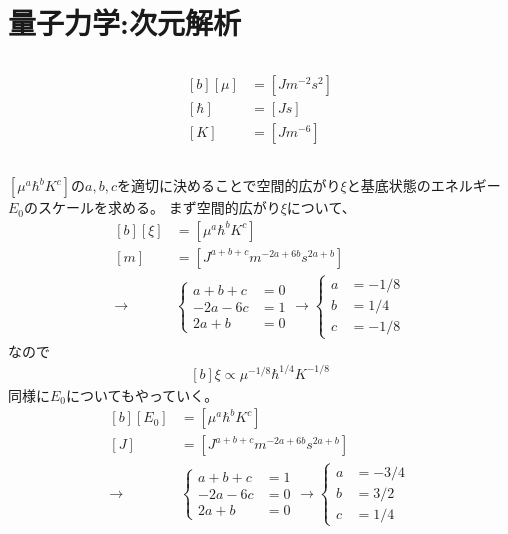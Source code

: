 \documentclass[../ap_2009.tex]{subfiles}
\begin{document}
\chapter{量子力学:次元解析}
\section{}
\begin{equation}\begin{aligned}[b]
    [\mu] &= [\si{Jm^{-2}s^2}]\\
    [\hbar] &= [\si{Js}]\\
    [K] &= [\si{Jm^{-6}}]
\end{aligned}\end{equation}

\section{}
\([\mu^a\hbar^bK^c]\)の\(a,b,c\)を適切に決めることで空間的広がり\(\xi\)と基底状態のエネルギー\(E_0\)のスケールを求める。
まず空間的広がり\(\xi\)について、
\begin{equation}\begin{aligned}[b]
    [\xi] &= [\mu^a\hbar^bK^c]\\
    [\si{m}] &= [\si{J^{a+b+c}m^{-2a+6b}s^{2a+b}}]\\
    \rightarrow&
    \begin{cases}
        a+b+c&=0\\
        -2a-6c&=1\\
        2a+b&=0
    \end{cases}
    \rightarrow
    \begin{cases}
        a&=-1/8\\
        b&=1/4\\
        c&=-1/8
    \end{cases}
\end{aligned}\end{equation}
なので
\begin{equation}\begin{aligned}[b]
    \xi \propto \mu^{-1/8}\hbar^{1/4}K^{-1/8}
\end{aligned}\end{equation}
同様に\(E_0\)についてもやっていく。
\begin{equation}\begin{aligned}[b]
    [E_0] &= [\mu^a\hbar^bK^c]\\
    [\si{J}] &= [\si{J^{a+b+c}m^{-2a+6b}s^{2a+b}}]\\
    \rightarrow&
    \begin{cases}
        a+b+c&=1\\
        -2a-6c&=0\\
        2a+b&=0
    \end{cases}
    \rightarrow
    \begin{cases}
        a&=-3/4\\
        b&=3/2\\
        c&=1/4
    \end{cases}
\end{aligned}\end{equation}
\end{document}
